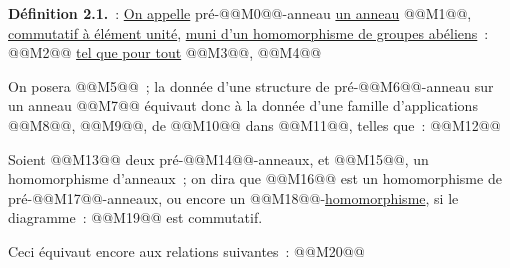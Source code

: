 
\textbf{Définition 2.1.}~: \uline{On appelle} pré-@@M0@@-anneau \uline{un anneau} @@M1@@, \uline{commutatif à élément unité}, \uline{muni d'un homomorphisme de groupes abéliens}~:
@@M2@@
\uline{tel que pour tout} @@M3@@, @@M4@@

On posera @@M5@@~; la donnée d'une structure de pré-@@M6@@-anneau sur un anneau @@M7@@ équivaut donc à la donnée d'une famille d'applications @@M8@@, @@M9@@, de @@M10@@ dans @@M11@@, telles que~:
@@M12@@

Soient @@M13@@ deux pré-@@M14@@-anneaux, et @@M15@@, un homomorphisme d'anneaux~; on dira que @@M16@@ est un homomorphisme de pré-@@M17@@-anneaux, ou encore un @@M18@@-\uline{homomorphisme}, si le diagramme~:
@@M19@@
est commutatif.

Ceci équivaut encore aux relations suivantes~:
@@M20@@

